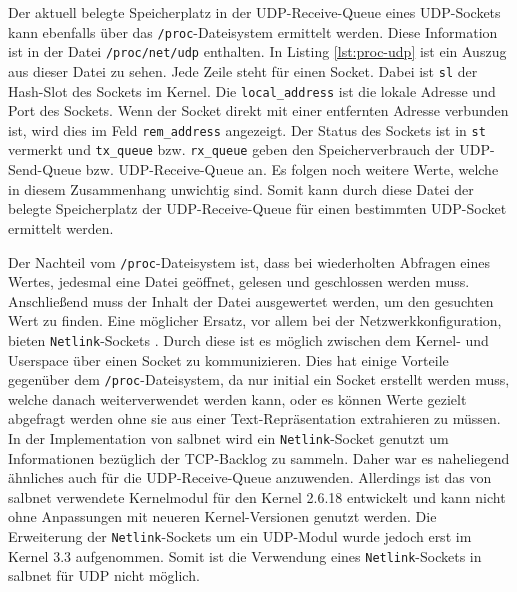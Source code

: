 \documentclass[a4paper, 12pt, BCOR10mm, DIV12, toc=bibliography, toc=listof, german]{scrbook}
\begin{document}
		Der aktuell belegte Speicherplatz in der UDP-Receive-Queue eines UDP-Sockets kann ebenfalls über
		das \texttt{/proc}-Dateisystem ermittelt werden. Diese Information ist in der Datei
		\texttt{/proc/net/udp} enthalten. In Listing \ref{lst:proc-udp} ist ein Auszug aus dieser Datei
		zu sehen. Jede Zeile steht für einen Socket. Dabei ist \texttt{sl} der Hash-Slot des Sockets im
		Kernel. Die \texttt{local\_address} ist die lokale Adresse und Port des Sockets. Wenn der Socket
		direkt  mit einer entfernten Adresse verbunden ist, wird dies im Feld \texttt{rem\_address} angezeigt.
		Der Status des Sockets ist in \texttt{st} vermerkt und \texttt{tx\_queue} bzw.
		\texttt{rx\_queue} geben den Speicherverbrauch der UDP-Send-Queue bzw. UDP-Receive-Queue an. Es
		folgen noch weitere Werte, welche in diesem Zusammenhang unwichtig sind. Somit kann durch diese
		Datei der belegte Speicherplatz der UDP-Receive-Queue für einen bestimmten UDP-Socket ermittelt werden.

		Der Nachteil vom \texttt{/proc}-Dateisystem ist, dass bei wiederholten Abfragen eines Wertes,
		jedesmal eine Datei geöffnet, gelesen und geschlossen werden muss. Anschließend muss der Inhalt
		der Datei ausgewertet werden, um den gesuchten Wert zu finden. Eine möglicher Ersatz, vor allem
		bei der Netzwerkkonfiguration, bieten \texttt{Netlink}-Sockets \cite{rfc3549, gusowski2009}.
		Durch diese ist es möglich zwischen dem Kernel- und Userspace über einen Socket zu
		kommunizieren. Dies hat einige Vorteile gegenüber dem \texttt{/proc}-Dateisystem, da nur initial
		ein Socket erstellt werden muss, welche danach weiterverwendet werden kann, oder es können Werte
		gezielt abgefragt werden ohne sie aus einer Text-Repräsentation extrahieren zu müssen. In der
		Implementation von salbnet \cite{zinke2012,salbnet} wird ein \texttt{Netlink}-Socket genutzt um
		Informationen bezüglich der TCP-Backlog zu sammeln. Daher war es naheliegend ähnliches auch für
		die UDP-Receive-Queue anzuwenden. Allerdings ist das von salbnet verwendete Kernelmodul für den
		Kernel 2.6.18 entwickelt und kann nicht ohne Anpassungen mit neueren Kernel-Versionen genutzt
		werden. Die Erweiterung der \texttt{Netlink}-Sockets um ein UDP-Modul wurde jedoch erst im
		Kernel 3.3\cite{udpnetlink} aufgenommen. Somit ist die Verwendung eines \texttt{Netlink}-Sockets
		in salbnet für UDP nicht möglich.

		

\end{document}
